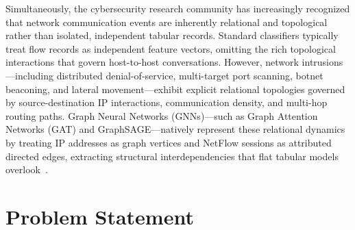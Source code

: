\documentclass[12pt,a4paper]{report}
\begin{document}
Simultaneously, the cybersecurity research community has increasingly recognized that network communication events are inherently relational and topological rather than isolated, independent tabular records. Standard classifiers typically treat flow records as independent feature vectors, omitting the rich topological interactions that govern host-to-host conversations. However, network intrusions---including distributed denial-of-service, multi-target port scanning, botnet beaconing, and lateral movement---exhibit explicit relational topologies governed by source-destination IP interactions, communication density, and multi-hop routing paths. Graph Neural Networks (GNNs)---such as Graph Attention Networks (GAT) and GraphSAGE---natively represent these relational dynamics by treating IP addresses as graph vertices and NetFlow sessions as attributed directed edges, extracting structural interdependencies that flat tabular models overlook~\cite{velickovic2018gat, hamilton2017graphsage}.

\section{Problem Statement}\label{sec:problem}
\end{document}
